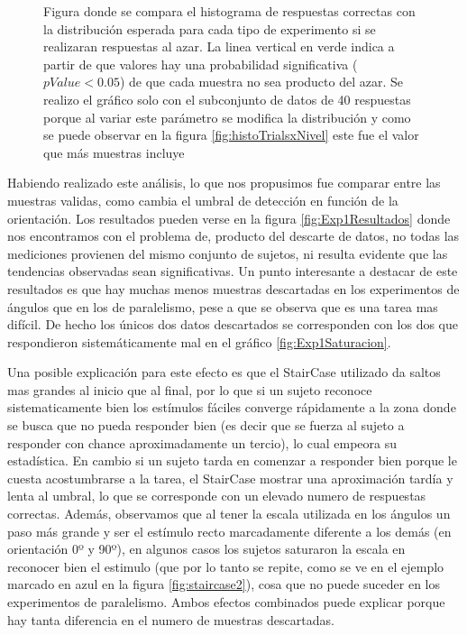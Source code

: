 \documentclass{article}
\begin{document}
\begin{figure}
\begin{subfigure}{.5\textwidth}
            \label{fig:sfig2}
        \end{subfigure}
        \caption{Figura donde se compara el histograma de respuestas correctas con la distribución esperada para cada tipo de experimento si se realizaran respuestas al azar. La linea vertical en verde indica a partir de que valores hay una probabilidad significativa ($pValue<0.05$) de que cada muestra no sea producto del azar. Se realizo el gráfico solo con el subconjunto de datos de 40 respuestas porque al variar este parámetro se modifica la distribución y como se puede observar en la figura \ref{fig:histoTrialsxNivel} este fue el valor que más muestras incluye}
        \label{fig:Exp1_Significancia}
    \end{figure}

    Habiendo realizado este análisis, lo que nos propusimos fue comparar entre las muestras validas, como cambia el umbral de detección en función de la orientación. Los resultados pueden verse en la figura \ref{fig:Exp1Resultados} donde nos encontramos con el problema de, producto del descarte de datos, no todas las mediciones provienen del mismo conjunto de sujetos, ni resulta evidente que las tendencias observadas sean significativas. Un punto interesante a destacar de este resultados es que hay muchas menos muestras descartadas en los experimentos de ángulos que en los de paralelismo, pese a que se observa que es una tarea mas difícil. De hecho los únicos dos datos descartados se corresponden con los dos que respondieron sistemáticamente mal en el gráfico \ref{fig:Exp1Saturacion}. 
    
    Una posible explicación para este efecto es que el StairCase utilizado da saltos mas grandes al inicio que al final, por lo que si un sujeto reconoce sistematicamente bien los estímulos fáciles converge rápidamente a la zona donde se busca que no pueda responder bien (es decir que se fuerza al sujeto a responder con chance aproximadamente un tercio), lo cual empeora su estadística. En cambio si un sujeto tarda en comenzar a responder bien porque le cuesta acostumbrarse a la tarea, el StairCase mostrar una aproximación tardía y lenta al umbral, lo que se corresponde con un elevado numero de respuestas correctas. Además, observamos que al tener la escala utilizada en los ángulos un paso más grande y ser el estímulo recto marcadamente diferente a los demás (en orientación 0º y 90º), en algunos casos los sujetos saturaron la escala en reconocer bien el estimulo (que por lo tanto se repite, como se ve en el ejemplo marcado en azul en la figura \ref{fig:staircase2}), cosa que no puede suceder en los experimentos de paralelismo. Ambos efectos combinados puede explicar porque hay tanta diferencia en el numero de muestras descartadas. 
    
\end{document}
